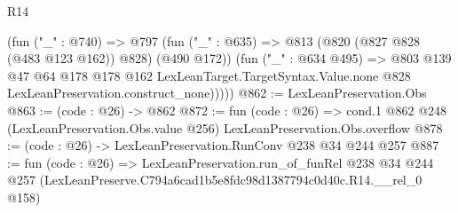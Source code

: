 \begin{lexlean}{R14}
\begin{coremodule}
          (fun ("_" : @740) =>
          @797
            (fun ("_" : @635) => @813 (@820 (@827 @828 (@483 @123 @162)) @828) (@490 @172))
            (fun ("_" : @634 @495) =>
            @803
              @139
              @47
              @64
              @178
              @178
              @162
              LexLeanTarget.TargetSyntax.Value.none
              @828
              LexLeanPreservation.construct_none)))))
@862 := LexLeanPreservation.Obs
@863 := (code : @26) -> @862
@872 := fun (code : @26) =>
  cond.{1} @862 @248 (LexLeanPreservation.Obs.value @256) LexLeanPreservation.Obs.overflow
@878 := (code : @26) -> LexLeanPreservation.RunConv @238 @34 @244 @257
@887 := fun (code : @26) =>
  LexLeanPreservation.run_of_funRel
    @238
    @34
    @244
    @257
    (LexLeanPreserve.C794a6cad1b5e8fdc98d1387794c0d40c.R14.__rel_0 @158)
\end{coremodule}
\end{lexlean}
